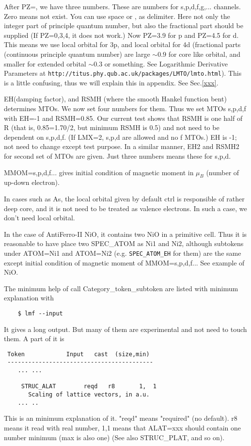 \documentclass[a4paper,10pt,epsf,fleqn]{article}
\begin{document}
\begin{itemize}
After PZ=, we have three numbers.
These are numbers for s,p,d,f,g,... channels. Zero means not exist.
You can use space or , as delimiter. 
Here not only the integer part of principle quantum number, but also 
the fractional part should be supplied (If PZ=0,3,4, it does not work.)
Now PZ=3.9 for p and PZ=4.5 for d. This means we use local orbital for
3p, and local orbital for 4d (fractional parts (continuous principle quantum number) 
are large $\sim 0.9$ for core like orbital, and smaller for extended
orbital $\sim 0.3$ or something. See Logarithmic Derivative Parameters
at \verb+http://titus.phy.qub.ac.uk/packages/LMTO/lmto.html+).
This is a little confusing, thus we will explain this in appendix. See Sec.\ref{xxx}.

EH(damping factor), and RSMH (where the smooth Hankel function bent)
determines MTOs. We now set four numbers for them. Thus we set MTOs
s,p,d,f with EH=-1 and RSMH=0.85. Our current test shows that RSMH is
one half of R (that is, 0.85=1.70/2, but minimum RSMH is 0.5) 
and not need to be dependent on s,p,d,f. (If LMX=2, s,p,d are allowed and no f MTOs.)
EH is -1; not need to change except test purpose.
In a similar manner, EH2 and RSMH2 for second set of MTOs are given.
Just three numbers means these for s,p,d. 

MMOM=s,p,d,f... gives initial condition of magnetic moment in $\mu_B$
(number of up-down electron).

In cases such as As, the local orbital given by default ctrl
is responsible of rather deep core, and it is not need to be treated 
as valence electrons. In such a case,
we don't need local orbital.

In the case of AntiFerro-II NiO, it contains 
two NiO in a primitive cell. Thus it is reasonable to have place two SPEC\_ATOM
as Ni1 and Ni2, although subtokens under
ATOM=Ni1 and ATOM=Ni2 (e.g. \verb+SPEC_ATOM_EH+ for them) are the same
except initial condition of magnetic moment of MMOM=s,p,d,f...
See example of NiO.
\end{itemize}

The minimum help of call Category\_token\_subtoken are listed with
minimum explanation with 
\begin{verbatim}
    $ lmf --input
\end{verbatim}
It gives a long output. But many of them are experimental and not need
to touch them. A part of it is
\begin{verbatim}
 Token            Input   cast  (size,min)
 ------------------------------------------
    ... ...

     STRUC_ALAT        reqd   r8       1,  1
       Scaling of lattice vectors, in a.u.
    ... ..
\end{verbatim}
This is an minimum explanation of it. "reqd" means "required" (no
default). r8 means it read with real number, 1,1 means
that ALAT=xxx should contain one number minimum (max is also one)
(See also STRUC\_PLAT, and so on).
\end{document}
